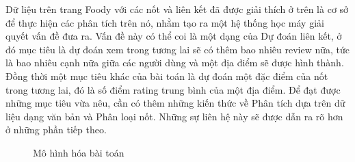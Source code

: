 \documentclass[12pt]{extarticle}
\begin{document}
			\par Dữ liệu trên trang Foody với các nốt và liên kết đã được giải thích ở trên là cơ sở để thực hiện các phân tích trên nó, nhằm tạo ra một hệ thống học máy giải quyết vấn đề đưa ra. Vấn đề này có thể coi là một dạng của Dự đoán liên kết, ở đó mục tiêu là dự đoán xem trong tương lai sẽ có thêm bao nhiêu review nữa, tức là bao nhiêu cạnh nữa giữa các người dùng và một địa điểm sẽ được hình thành. Đồng thời một mục tiêu khác của bài toán là dự đoán một đặc điểm của nốt trong tương lai, đó là số điểm rating trung bình của một địa điểm. Để đạt được những mục tiêu vừa nêu, cần có thêm những kiến thức về Phân tích dựa trên dữ liệu dạng văn bản và Phân loại nốt. Những sự liên hệ này sẽ được dẫn ra rõ hơn ở những phần tiếp theo.

			\begin{figure}[h!]

				\caption{Mô hình hóa bài toán}
				\label{fig:problem}
			\end{figure} 
\end{document}
